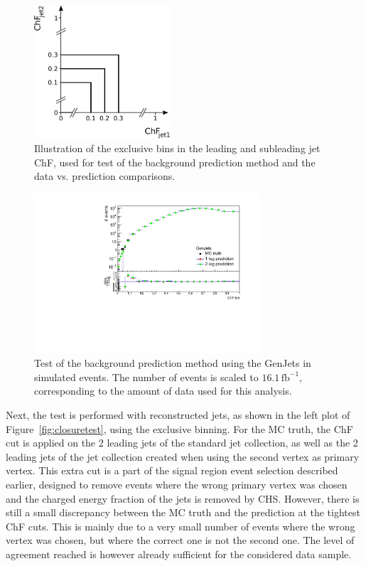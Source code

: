\begin{figure}[ht]
  \centering
  \includegraphics[width=0.45\textwidth]{figures/exclusive_binning.pdf}\hfill%
  \caption{Illustration of the exclusive bins in the leading and subleading jet ChF, used for test of the background prediction method and the data vs. prediction comparisons.}
  \label{fig:excl_binning}
\end{figure}

\begin{figure}[ht]
  \centering
  \includegraphics[width=0.75\textwidth]{figures/closure_test_QCD_GenJets_exclusive_correct.pdf}\hfill%
  \caption{Test of the background prediction method using the GenJets in simulated events. The number of events is scaled to $16.1\, \mathrm{fb}^{-1}$, corresponding to the amount of data used for this analysis.}
  \label{fig:closuretest_GenJets}
\end{figure}

Next, the test is performed with reconstructed jets, as shown in the left plot of Figure~\ref{fig:closuretest}, using the exclusive binning. For the MC truth, the ChF cut is applied on the 2 leading jets of the standard jet collection, as well as the 2 leading jets of the jet collection created when using the second vertex as primary vertex. This extra cut is a part of the signal region event selection described earlier, designed to remove events where the wrong primary vertex was chosen and the charged energy fraction of the jets is removed by \ac{CHS}. However, there is still a small discrepancy between the MC truth and the prediction at the tightest ChF cuts. This is mainly due to a very small number of events where the wrong vertex was chosen, but where the correct one is not the second one. The level of agreement reached is however already sufficient for the considered data sample.

